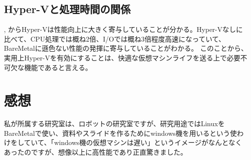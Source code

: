 \documentclass[onecolumn]{preport}
\begin{document}
\subsection{Hyper-Vと処理時間の関係}
, からHyper-Vは性能向上に大きく寄与していることが分かる。Hyper-Vなしに比べて、CPU処理では概ね2倍、I/Oでは概ね3倍程度高速になっていて、BareMetalに遜色ない性能の発揮に寄与していることがわかる。
このことから、実用上Hyper-Vを有効にすることは、快適な仮想マシンライフを送る上で必要不可欠な機能であると言える。



\section{感想}
私が所属する研究室は、ロボットの研究室ですが、研究用途ではLinuxをBareMetalで使い、資料やスライドを作るためにwindows機を用いるという使わけをしていて、「windows機の仮想マシンは遅い」というイメージがなんとなくあったのですが、想像以上に高性能であり正直驚きました。



\end{document}
